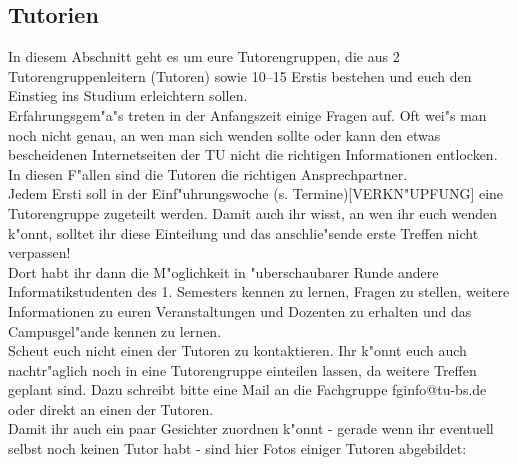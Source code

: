 \subsection{Tutorien}

In diesem Abschnitt geht es um eure Tutorengruppen, die aus 2 Tutorengruppenleitern (Tutoren) sowie 10--15 Erstis bestehen und euch den Einstieg ins Studium erleichtern sollen.\\
Erfahrungsgem"a"s treten in der Anfangszeit einige Fragen auf. Oft wei"s man noch nicht genau, an wen man sich wenden sollte oder kann den etwas bescheidenen Internetseiten der TU nicht die richtigen Informationen entlocken. In diesen F"allen sind die Tutoren die richtigen Ansprechpartner.\\
Jedem Ersti soll in der Einf"uhrungswoche (s. Termine)[VERKN"UPFUNG] eine Tutorengruppe zugeteilt werden. Damit auch ihr wisst, an wen ihr euch wenden k"onnt, solltet ihr diese Einteilung und das anschlie"sende erste Treffen nicht verpassen!\\
Dort habt ihr dann die M"oglichkeit in "uberschaubarer Runde andere Informatikstudenten des 1. Semesters kennen zu lernen, Fragen zu stellen, weitere Informationen zu euren Veranstaltungen und Dozenten zu erhalten und das Campusgel"ande kennen zu lernen.\\
Scheut euch nicht einen der Tutoren zu kontaktieren. Ihr k"onnt euch auch nachtr"aglich noch in eine Tutorengruppe einteilen lassen, da weitere Treffen geplant sind. Dazu schreibt bitte eine Mail an die Fachgruppe fginfo@tu-bs.de oder direkt an einen der Tutoren.\\
Damit ihr auch ein paar Gesichter zuordnen k"onnt - gerade wenn ihr eventuell selbst noch keinen Tutor habt - sind hier Fotos einiger Tutoren abgebildet:

\onecolumn

\captionsetup[subfloat]{labelformat=empty}


